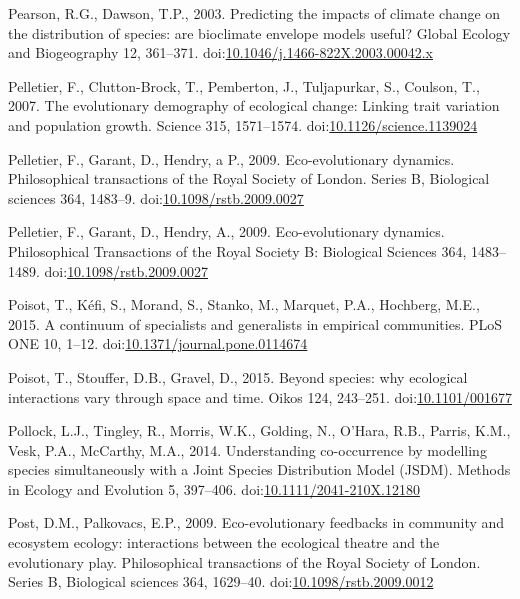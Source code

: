 \hypertarget{ref-Pearson2003}{}
Pearson, R.G., Dawson, T.P., 2003. Predicting the impacts of climate
change on the distribution of species: are bioclimate envelope models
useful? Global Ecology and Biogeography 12, 361--371.
doi:\href{https://doi.org/10.1046/j.1466-822X.2003.00042.x}{10.1046/j.1466-822X.2003.00042.x}

\hypertarget{ref-Pelletier2007}{}
Pelletier, F., Clutton-Brock, T., Pemberton, J., Tuljapurkar, S.,
Coulson, T., 2007. The evolutionary demography of ecological change:
Linking trait variation and population growth. Science 315, 1571--1574.
doi:\href{https://doi.org/10.1126/science.1139024}{10.1126/science.1139024}

\hypertarget{ref-Pelletier2009}{}
Pelletier, F., Garant, D., Hendry, a P., 2009. Eco-evolutionary
dynamics. Philosophical transactions of the Royal Society of London.
Series B, Biological sciences 364, 1483--9.
doi:\href{https://doi.org/10.1098/rstb.2009.0027}{10.1098/rstb.2009.0027}

\hypertarget{ref-Pelletier2009a}{}
Pelletier, F., Garant, D., Hendry, A., 2009. Eco-evolutionary dynamics.
Philosophical Transactions of the Royal Society B: Biological Sciences
364, 1483--1489.
doi:\href{https://doi.org/10.1098/rstb.2009.0027}{10.1098/rstb.2009.0027}

\hypertarget{ref-Poisot2015c}{}
Poisot, T., Kéfi, S., Morand, S., Stanko, M., Marquet, P.A., Hochberg,
M.E., 2015. A continuum of specialists and generalists in empirical
communities. PLoS ONE 10, 1--12.
doi:\href{https://doi.org/10.1371/journal.pone.0114674}{10.1371/journal.pone.0114674}

\hypertarget{ref-Poisot2015}{}
Poisot, T., Stouffer, D.B., Gravel, D., 2015. Beyond species: why
ecological interactions vary through space and time. Oikos 124,
243--251. doi:\href{https://doi.org/10.1101/001677}{10.1101/001677}

\hypertarget{ref-Pollock2014}{}
Pollock, L.J., Tingley, R., Morris, W.K., Golding, N., O'Hara, R.B.,
Parris, K.M., Vesk, P.A., McCarthy, M.A., 2014. Understanding
co-occurrence by modelling species simultaneously with a Joint Species
Distribution Model (JSDM). Methods in Ecology and Evolution 5, 397--406.
doi:\href{https://doi.org/10.1111/2041-210X.12180}{10.1111/2041-210X.12180}

\hypertarget{ref-Post2009}{}
Post, D.M., Palkovacs, E.P., 2009. Eco-evolutionary feedbacks in
community and ecosystem ecology: interactions between the ecological
theatre and the evolutionary play. Philosophical transactions of the
Royal Society of London. Series B, Biological sciences 364, 1629--40.
doi:\href{https://doi.org/10.1098/rstb.2009.0012}{10.1098/rstb.2009.0012}

